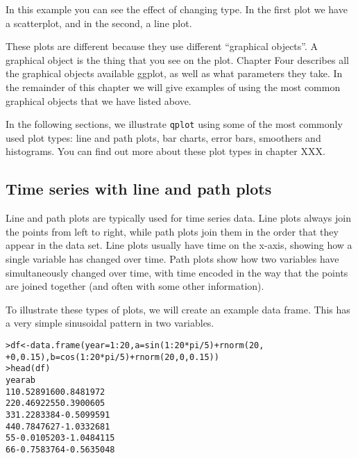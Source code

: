 In this example you can see the effect of changing type.  In the first plot we have a scatterplot, and in the second, a line plot.



These plots are different because they use different ``graphical objects''.  A graphical object is the thing that you see on the plot.  Chapter Four describes all the graphical objects available ggplot, as well as what parameters they take.  In the remainder of this chapter we will give examples of using the most common graphical objects that we have listed above.

In the following sections, we illustrate {\tt qplot} using some of the most commonly used plot types: line and path plots, bar charts, error bars, smoothers and histograms.  You can find out more about these plot types in chapter XXX.

\subsection{Time series with line and path plots}\label{sub:line_plot}

Line and path plots are typically used for time series data.  Line plots always join the points from left to right, while path plots join them in the order that they appear in the data set.  Line plots usually have time on the x-axis, showing how a single variable has changed over time.  Path plots show how two variables have simultaneously changed over time, with time encoded in the way that the points are joined together (and often with some other information).

To illustrate these types of plots, we will create an example data frame.  This has a very simple sinusoidal pattern in two variables.

\begin{alltt}
> df <- data.frame(year = 1:20, a = sin(1:20 * pi/5) + rnorm(20, 
+     0, 0.15), b = cos(1:20 * pi/5) + rnorm(20, 0, 0.15))
> head(df)
  year          a          b
1    1  0.5289160  0.8481972
2    2  0.4692255  0.3900605
3    3  1.2283384 -0.5099591
4    4  0.7847627 -1.0332681
5    5 -0.0105203 -1.0484115
6    6 -0.7583764 -0.5635048

\end{alltt}%

